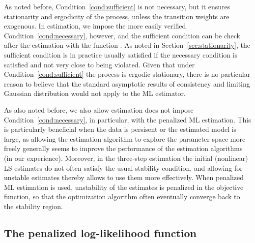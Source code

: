 \documentclass[nojss]{jss}
\begin{document}
As noted before, Condition~\ref{cond:sufficient} is not necessary, but it ensures stationarity and ergodicity of the process, unless the transition weights are exogenous. In estimation, we impose the more easily verified Condition~\ref{cond:necessary}, however, and the sufficient condition can be check after the estimation with the function . As noted in Section~\ref{sec:stationarity}, the sufficient condition is in practice usually satisfied if the necessary condition is satisfied and not very close to being violated. Given that under Condition~\ref{cond:sufficient} the process is ergodic stationary, there is no particular reason to believe that the standard asymptotic results of consistency and limiting Gaussian distribution would not apply to the ML estimator.

As also noted before, we also allow estimation does not impose Condition~\ref{cond:necessary}, in particular, with the penalized ML estimation. This is particularly beneficial when the data is persisent or the estimated model is large, as allowing the estimation algorithm to explore the parameter space more freely generally seems to improve the performance of the estimation algorithms (in our experience). Moreover, in the three-step estimation the initial (nonlinear) LS estimates do not often satisfy the usual stability condition, and allowing for unstable estimates thereby allows to use them more effectively. When penalized ML estimation is used, unstability of the estimates is penalized in the objective function, so that the optimization algorithm often eventually converge back to the stability region.

\subsection{The penalized log-likelihood function}
\end{document}
